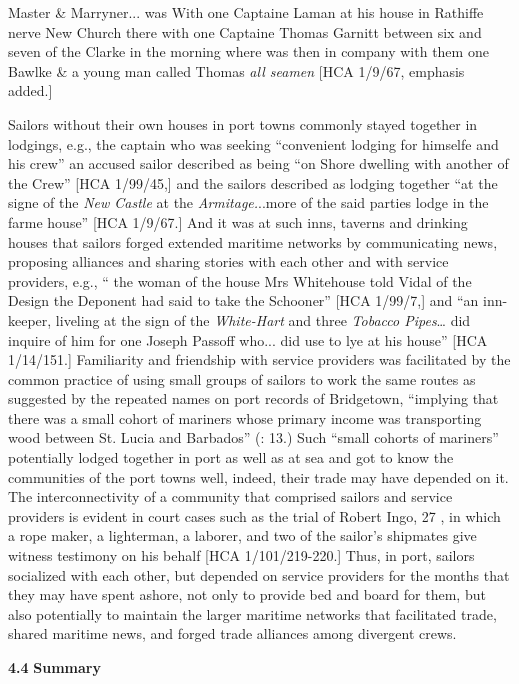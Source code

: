 Master \& Marryner... was With one Captaine Laman at his house in Rathiffe nerve New Church there with one Captaine Thomas Garnitt between six and seven of the Clarke in the morning where was then in company with them one Bawlke \& a young man called Thomas \textit{all seamen} [HCA 1/9/67, emphasis added.] 

Sailors without their own houses in port towns commonly stayed together in lodgings, e.g., the captain who was seeking “convenient lodging for himselfe and his crew” \citep[11,]{Gage1648} an accused sailor described as being “on Shore dwelling with another of the Crew” [HCA 1/99/45,] and the sailors described as lodging together “at the signe of the \textit{New Castle} at the \textit{Armitage.}..more of the said parties lodge in the farme house” [HCA 1/9/67.] And it was at such inns, taverns and drinking houses that sailors forged extended maritime networks by communicating news, proposing alliances and sharing stories with each other and with service providers, e.g., “ the woman of the house Mrs Whitehouse told Vidal of the Design the Deponent had said to take the Schooner” [HCA 1/99/7,] and “an inn-keeper, liveling at the sign of the \textit{White-Hart} and three \textit{Tobacco Pipes}… did inquire of him for one Joseph Passoff who... did use to lye at his house” [HCA 1/14/151.] Familiarity and friendship with service providers was facilitated by the common practice of using small groups of sailors to work the same routes as suggested by the repeated names on port records of Bridgetown, “implying that there was a small cohort of mariners whose primary income was transporting wood between St. Lucia and Barbados” (\citealt{Draper2016}: 13.) Such “small cohorts of mariners” potentially lodged together in port as well as at sea and got to know the communities of the port towns well, indeed, their trade may have depended on it. The interconnectivity of a community that comprised sailors and service providers is evident in court cases such as the trial of Robert Ingo, 27 \citealt{May1636}, in which a rope maker, a lighterman, a laborer, and two of the sailor’s shipmates give witness testimony on his behalf [HCA 1/101/219-220.] Thus, in port, sailors socialized with each other, but depended on service providers for the months that they may have spent ashore, not only to provide bed and board for them, but also potentially to maintain the larger maritime networks that facilitated trade, shared maritime news, and forged trade alliances among divergent crews. 

\textbf{4.4} \textbf{Summary}

